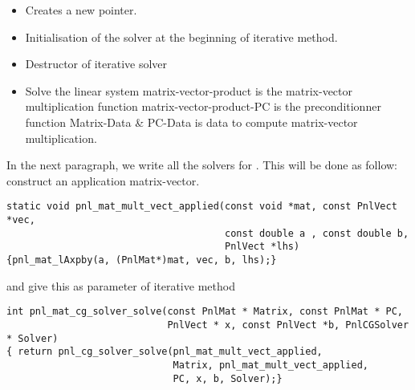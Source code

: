 \begin{itemize}
\item {}
  \sshortdescribe Creates a new  pointer.  
\item {}
  \sshortdescribe Initialisation of the solver at the beginning of iterative method.  
\item {}
  \sshortdescribe Destructor of iterative solver  
\item {}
  \sshortdescribe Solve the linear system matrix-vector-product is the matrix-vector multiplication function matrix-vector-product-PC is the preconditionner function Matrix-Data \& PC-Data is data to compute matrix-vector multiplication.  
\end{itemize}


In the next paragraph, we write all the solvers for . This will be done as
follow: construct an application matrix-vector.
\begin{verbatim}
static void pnl_mat_mult_vect_applied(const void *mat, const PnlVect *vec, 
                                      const double a , const double b, 
                                      PnlVect *lhs)
{pnl_mat_lAxpby(a, (PnlMat*)mat, vec, b, lhs);}
\end{verbatim}
and give this as parameter of iterative method
\begin{verbatim}
int pnl_mat_cg_solver_solve(const PnlMat * Matrix, const PnlMat * PC, 
                            PnlVect * x, const PnlVect *b, PnlCGSolver * Solver)
{ return pnl_cg_solver_solve(pnl_mat_mult_vect_applied, 
                             Matrix, pnl_mat_mult_vect_applied, 
                             PC, x, b, Solver);}
\end{verbatim}

